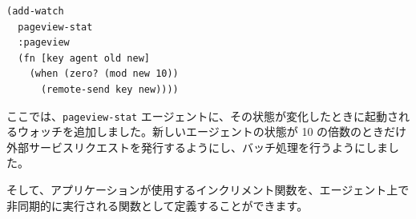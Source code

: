 \begin{lstlisting}[numbers=none]
(add-watch
  pageview-stat
  :pageview
  (fn [key agent old new]
    (when (zero? (mod new 10))
      (remote-send key new))))
\end{lstlisting}

ここでは、\texttt{pageview-stat} エージェントに、その状態が変化したときに起動されるウォッチを追加しました。新しいエージェントの状態が 10 の倍数のときだけ外部サービスリクエストを発行するようにし、バッチ処理を行うようにしました。

そして、アプリケーションが使用するインクリメント関数を、エージェント上で非同期的に実行される関数として定義することができます。





